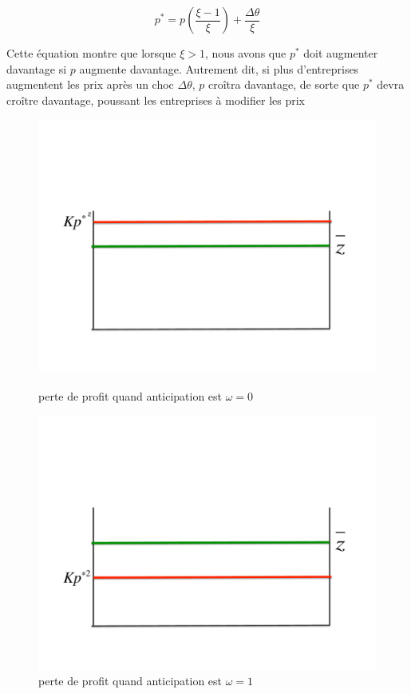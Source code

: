 \documentclass[11pt,a4paper]{article}
\begin{document}
\begin{enumerate}
\begin{equation}\label{price2}
p^{\ast }=p\left(\frac{\xi-1}{\xi }\right) + \frac{\Delta \theta}{\xi} 
\end{equation}%


Cette équation montre que lorsque $ \xi>1$, nous avons que $p^{\ast}$ doit augmenter davantage si $ p $ augmente davantage. Autrement dit, si plus d'entreprises augmentent les prix après un choc $ \Delta \theta $, $ p $ croîtra davantage, de sorte que $ p^{\ast} $ devra croître davantage, poussant les entreprises à modifier les prix 

 


\begin{figure}[!tbp]
  \centering
  \begin{minipage}[b]{0.4\textwidth}
    \includegraphics[width=1.3\textwidth]{pc3_assets/opti.pdf}
    \caption{perte de profit quand anticipation est $\omega =0$}
  \end{minipage}
  \hfill
  \begin{minipage}[b]{0.4\textwidth}
    \includegraphics[width=1.3\textwidth]{pc3_assets/opt.pdf}
    \caption{perte de profit quand anticipation est $\omega =1$}
  \end{minipage}
\end{figure}


\end{enumerate}
\end{document}
